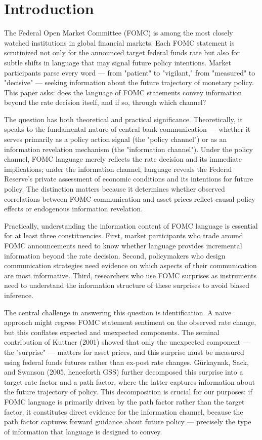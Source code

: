 \documentclass[12pt]{article}
\begin{document}
\section{Introduction}

The Federal Open Market Committee (FOMC) is among the most closely watched institutions in global financial markets. Each FOMC statement is scrutinized not only for the announced target federal funds rate but also for subtle shifts in language that may signal future policy intentions. Market participants parse every word --- from "patient" to "vigilant," from "measured" to "decisive" --- seeking information about the future trajectory of monetary policy. This paper asks: does the language of FOMC statements convey information beyond the rate decision itself, and if so, through which channel?

The question has both theoretical and practical significance. Theoretically, it speaks to the fundamental nature of central bank communication --- whether it serves primarily as a policy action signal (the "policy channel") or as an information revelation mechanism (the "information channel"). Under the policy channel, FOMC language merely reflects the rate decision and its immediate implications; under the information channel, language reveals the Federal Reserve's private assessment of economic conditions and its intentions for future policy. The distinction matters because it determines whether observed correlations between FOMC communication and asset prices reflect causal policy effects or endogenous information revelation.

Practically, understanding the information content of FOMC language is essential for at least three constituencies. First, market participants who trade around FOMC announcements need to know whether language provides incremental information beyond the rate decision. Second, policymakers who design communication strategies need evidence on which aspects of their communication are most informative. Third, researchers who use FOMC surprises as instruments need to understand the information structure of these surprises to avoid biased inference.

The central challenge in answering this question is identification. A naive approach might regress FOMC statement sentiment on the observed rate change, but this conflates expected and unexpected components. The seminal contribution of Kuttner (2001) showed that only the unexpected component --- the "surprise" --- matters for asset prices, and this surprise must be measured using federal funds futures rather than ex-post rate changes. G\"urkaynak, Sack, and Swanson (2005, henceforth GSS) further decomposed this surprise into a target rate factor and a path factor, where the latter captures information about the future trajectory of policy. This decomposition is crucial for our purposes: if FOMC language is primarily driven by the path factor rather than the target factor, it constitutes direct evidence for the information channel, because the path factor captures forward guidance about future policy --- precisely the type of information that language is designed to convey.
\end{document}

